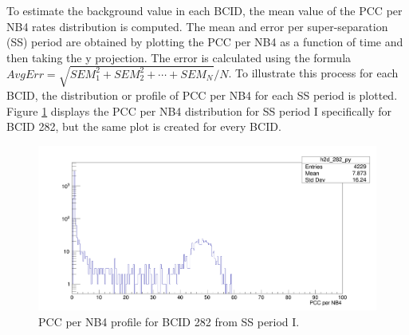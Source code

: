 To estimate the background value in each BCID, the mean value of the PCC per NB4 rates distribution is computed. The mean and error per super-separation (SS) period are obtained by plotting the PCC per NB4 as a function of time and then taking the y projection. The error is calculated using the formula $AvgErr = \sqrt{SEM_1^2 + SEM_2^2 + \cdots + SEM_N}/N$. To illustrate this process for each BCID, the distribution or profile of PCC per NB4 for each SS period is plotted. Figure \ref{ss1_hist_282} displays the PCC per NB4 distribution for SS period I specifically for BCID 282, but the same plot is created for every BCID.\\


\begin{center}
  \begin{figure}[h!]
    \centering
    \includegraphics[scale=.18]{Chapter4/ss1_histo_bx282.png}
    \caption[PCC per NB4 profile for BCID 282 from SS period I]{ PCC per NB4 profile for BCID 282 from SS period I.} 
    \label{ss1_hist_282}
  \end{figure}
\end{center}

